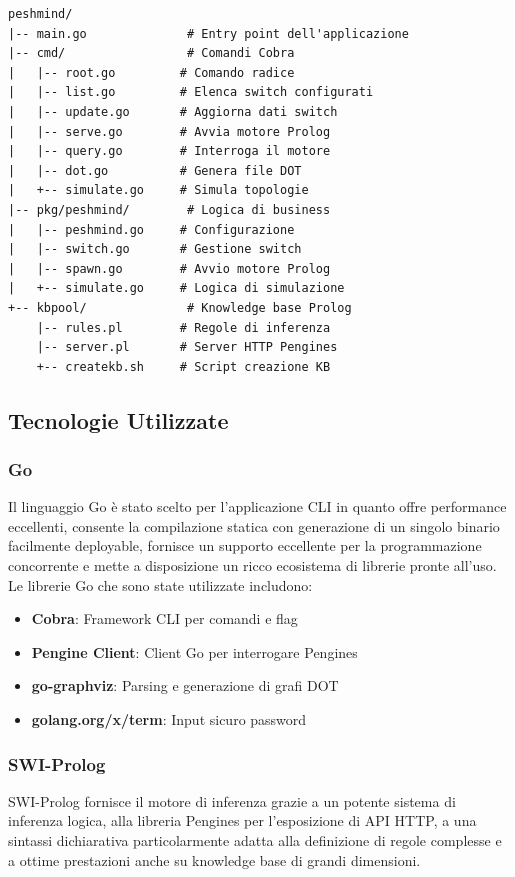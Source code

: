 \documentclass[12pt,a4paper]{article}
\begin{document}
\begin{verbatim}
peshmind/
|-- main.go              # Entry point dell'applicazione
|-- cmd/                 # Comandi Cobra
|   |-- root.go         # Comando radice
|   |-- list.go         # Elenca switch configurati
|   |-- update.go       # Aggiorna dati switch
|   |-- serve.go        # Avvia motore Prolog
|   |-- query.go        # Interroga il motore
|   |-- dot.go          # Genera file DOT
|   +-- simulate.go     # Simula topologie
|-- pkg/peshmind/        # Logica di business
|   |-- peshmind.go     # Configurazione
|   |-- switch.go       # Gestione switch
|   |-- spawn.go        # Avvio motore Prolog
|   +-- simulate.go     # Logica di simulazione
+-- kbpool/              # Knowledge base Prolog
    |-- rules.pl        # Regole di inferenza
    |-- server.pl       # Server HTTP Pengines
    +-- createkb.sh     # Script creazione KB
\end{verbatim}
\subsection{Tecnologie Utilizzate}

\subsubsection{Go}

Il linguaggio Go è stato scelto per l'applicazione CLI in quanto offre performance eccellenti,
 consente la compilazione statica con generazione di un singolo binario facilmente deployable, 
 fornisce un supporto eccellente per la programmazione concorrente e mette a disposizione un ricco
  ecosistema di librerie pronte all'uso. \\
Le librerie Go che sono state utilizzate includono:
\begin{itemize}
    \item \textbf{Cobra}: Framework CLI per comandi e flag
    \item \textbf{Pengine Client}: Client Go per interrogare Pengines
    \item \textbf{go-graphviz}: Parsing e generazione di grafi DOT
    \item \textbf{golang.org/x/term}: Input sicuro password
\end{itemize}
\subsubsection{SWI-Prolog}

SWI-Prolog fornisce il motore di inferenza grazie a un potente sistema di inferenza logica, alla 
libreria Pengines per l'esposizione di API HTTP, a una sintassi dichiarativa particolarmente adatta alla 
definizione di regole complesse e a ottime prestazioni anche su knowledge base di grandi dimensioni.
\end{document}
